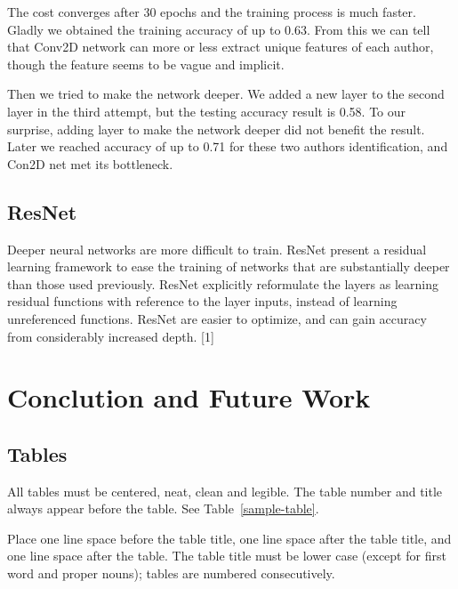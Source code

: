 \documentclass{article}
\begin{document}

The cost converges after 30 epochs and the training process is much faster. Gladly we obtained the training accuracy of up to 0.63. From this we can tell that Conv2D network can more or less  extract unique features of each author, though the feature seems to be vague and implicit.

Then we tried to make the network deeper. We added a new layer to the second layer in the third attempt, but the testing accuracy result is 0.58. To our surprise, adding layer to make the network deeper did not benefit the result. Later we reached accuracy of up to 0.71 for these two authors identification, and Con2D net met its bottleneck.



\subsection{ResNet}

Deeper neural networks are more difficult to train. ResNet present a residual learning framework to ease the training of networks that are substantially deeper than those used previously. ResNet explicitly reformulate the layers as learning residual functions with reference to the layer inputs, instead of learning unreferenced functions. ResNet are easier to optimize, and can gain accuracy from considerably increased depth. [1]










\section{Conclution and Future Work}





\subsection{Tables}

All tables must be centered, neat, clean and legible.  The table
number and title always appear before the table.  See
Table~\ref{sample-table}.

Place one line space before the table title, one line space after the
table title, and one line space after the table. The table title must
be lower case (except for first word and proper nouns); tables are
numbered consecutively.
\end{document}
